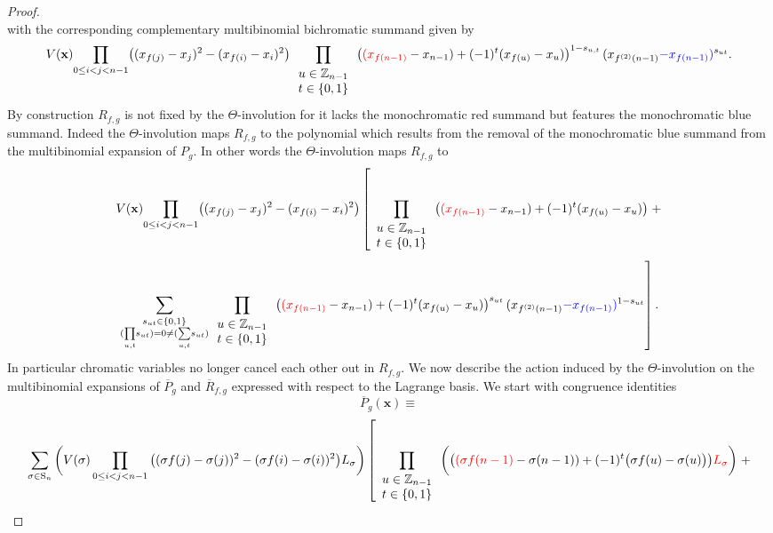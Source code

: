\begin{proof}
\[\]
with the corresponding complementary multibinomial bichromatic summand given by
\[
V(\mathbf{x})\underset{0\le i<j<n-1}{\prod}\big((x_{f(j)}-x_{j})^{2}-(x_{f(i)}-x_{i})^{2}\big)\prod_{\begin{array}{c}
u\in\mathbb{Z}_{n-1}\\
t\in\{0,1\}
\end{array}}\big({\color{red}(x_{f(n-1)}}-x_{n-1})+(-1)^{t}(x_{f(u)}-x_{u})\big)^{1-s_{u,t}}\,(x_{f^{(2)}(n-1)}{\color{blue}-x_{f(n-1)}}{\color{blue})}^{s_{ut}}.
\]
By construction $R_{f,g}$ is not fixed by the $\Theta$-involution for it lacks the monochromatic red summand but features the monochromatic blue summand. Indeed the $\Theta$-involution maps $R_{f,g}$ to the polynomial which results from the removal of the monochromatic blue summand from the multibinomial expansion of $P_{g}$. In other words the $\Theta$-involution maps $R_{f,g}$ to
\[
V(\mathbf{x})\underset{0\le i<j<n-1}{\prod}\big((x_{f(j)}-x_{j})^{2}-(x_{f(i)}-x_{i})^{2}\big)\left[\prod_{\begin{array}{c}
u\in\mathbb{Z}_{n-1}\\
t\in\{0,1\}
\end{array}}\big({\color{red}(x_{f(n-1)}}-x_{n-1})+(-1)^{t}(x_{f(u)}-x_{u})\big)\right.+
\]
\[
\left.\sum_{\substack{s_{ut}\in\{0,1\}\\
(\underset{u,t}{\prod}s_{ut})=0\ne(\underset{u,t}{\sum}s_{ut})
}
}\prod_{\begin{array}{c}
u\in\mathbb{Z}_{n-1}\\
t\in\{0,1\}
\end{array}}\big({\color{red}(x_{f(n-1)}}-x_{n-1})+(-1)^{t}(x_{f(u)}-x_{u})\big)^{s_{ut}}\,(x_{f^{(2)}(n-1)}{\color{blue}-x_{f(n-1)}}{\color{blue})}^{1-s_{ut}}\right].
\]
In particular chromatic variables no longer cancel each other out in  $R_{f,g}$. We now describe the action induced by the $\Theta$-involution on the multibinomial expansions of $\overline{P}_{g}$ and $\overline{R}_{f,g}$ expressed with respect to the Lagrange basis. We start with congruence identities
\[
\overline{P}_{g}(\mathbf{x})\equiv
\]
\[
\sum_{\sigma\in\text{S}_{n}}\bigg(V(\sigma)\prod_{0\le i<j<n-1}\big((\sigma f(j)-\sigma(j))^{2}-(\sigma f(i)-\sigma(i))^{2}\big)L_{\sigma}\bigg)\left[\prod_{\begin{array}{c}
u\in\mathbb{Z}_{n-1}\\
t\in\{0,1\}
\end{array}}\bigg(\big({\color{red}(\sigma f(n-1)}-\sigma(n-1))+(-1)^{t}\big(\sigma f(u)-\sigma(u)\big)\big){\color{red}L_{\sigma}}\bigg)\right.+
\]
\end{proof}
